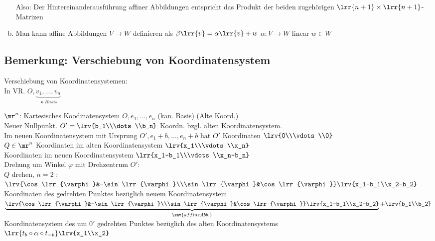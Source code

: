 \begin{enumerate}[a)]
			Also: Der Hintereinanderausführung affiner Abbildungen entspricht das Produkt der beiden zugehörigen $\lrr{n+1}\times\lrr{n+1}$-Matrizen
		\item Man kann affine Abbildungen $V\rightarrow W$ definieren als $\beta\lrr{v}=\alpha\lrr{v}+w$ $\alpha:V\rightarrow W$ linear $w\in W$
	\end{enumerate}
	
\subsection{Bemerkung: Verschiebung von Koordinatensystem}
	Verschiebung von Koordinatensystemen:\\
	In VR. $O,\underbrace{v_1,\dots,v_n}_{\smt{Basis}}$
	
	
	$\mr^n$: Kartesisches Koodinatensystem $O,e_1,\dots,e_n$ (kan. Basis) (Alte Koord.)\\
	Neuer Nullpunkt. $O'=\lrv{b_1\\\dots\\b_n}$ Koordn. bzgl. alten Koordinatensystem.\\
	Im neuen Koordinatensystem mit Ursprung $O',e_1+b,\dots,e_n+b$ hat $O'$ Koordinaten $\lrv{0\\\vdots\\0}$\\
	$Q\in\mr^n$ Koordinaten im alten Koordinatensystem $\lrv{x_1\\\vdots\\x_n}$\\
	Koordinaten im neuen Koordinatensystem $\lrr{x_1-b_1\\\vdots\\x_n-b_n}$\\
	Drehung um Winkel $\varphi$ mit Drehzentrum $O'$:\\
	$Q$ drehen, $n=2$ : $\lrv{\cos\lrr{\varphi}&-\sin\lrr{\varphi}\\\sin\lrr{\varphi}&\cos\lrr{\varphi}}\lrv{x_1-b_1\\x_2-b_2}$ Koordinaten des gedrehten Punktes bezüglich neuem Koordinatensystem\\
	$\underbrace{\lrv{\cos\lrr{\varphi}&-\sin\lrr{\varphi}\\\sin\lrr{\varphi}&\cos\lrr{\varphi}}\lrv{x_1-b_1\\x_2-b_2}}_{\smt{affine Abb.}}+\lrv{b_1\\b_2}$\\
	Koordinatensystem des um $0'$ gedrehten Punktes bezüglich des alten Koordinatensystems\\
	$\lrr{t_b\circ\alpha\circ t_{-b}}\lrv{x_1\\x_2}$
